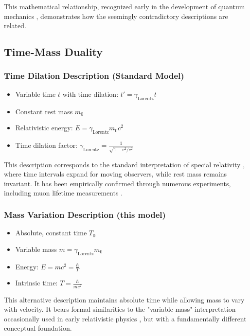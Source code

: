 \documentclass[a4paper,12pt]{article}
\newcommand{\Tzero}{T_0}
\newcommand{\gammaf}{\gamma_{\text{Lorentz}}}
\begin{document}
	This mathematical relationship, recognized early in the development of quantum mechanics \cite{Born1926}, demonstrates how the seemingly contradictory descriptions are related.
	
	\subsection{Time-Mass Duality}
	
	\subsubsection{Time Dilation Description (Standard Model)}
	\begin{itemize}[leftmargin=*,nosep]
		\item Variable time $t$ with time dilation: $t' = \gammaf t$
		\item Constant rest mass $m_0$
		\item Relativistic energy: $E = \gammaf m_0c^2$
		\item Time dilation factor: $\gammaf = \frac{1}{\sqrt{1-v^2/c^2}}$
	\end{itemize}
	
	This description corresponds to the standard interpretation of special relativity \cite{Einstein1905}, where time intervals expand for moving observers, while rest mass remains invariant. It has been empirically confirmed through numerous experiments, including muon lifetime measurements \cite{Bailey1977}.
	
	\subsubsection{Mass Variation Description (this model)}
	\begin{itemize}[leftmargin=*,nosep]
		\item Absolute, constant time $\Tzero$
		\item Variable mass $m = \gammaf m_0$
		\item Energy: $E = mc^2 = \frac{\hbar}{T}$
		\item Intrinsic time: $T = \frac{\hbar}{mc^2}$
	\end{itemize}
	
	This alternative description maintains absolute time while allowing mass to vary with velocity. It bears formal similarities to the "variable mass" interpretation occasionally used in early relativistic physics \cite{Tolman1917}, but with a fundamentally different conceptual foundation.
	
\end{document}

